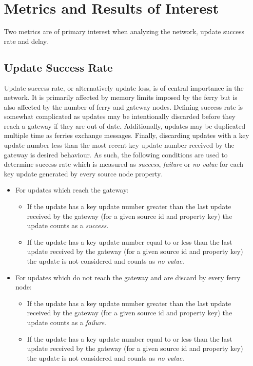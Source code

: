 \section{Metrics and Results of Interest }
\label{sec:metrics}

Two metrics are of primary interest when analyzing the network, update success rate and delay.

\subsection{Update Success Rate}
\label{sec:packetloss}

Update success rate, or alternatively update loss, is of central importance in the network.
It is primarily affected by memory limits imposed by the ferry but is also affected by the number of ferry and gateway nodes.
Defining success rate is somewhat complicated as updates may be intentionally discarded before they reach a gateway if they are out of date.
Additionally, updates may be duplicated multiple time as ferries exchange messages.
Finally, discarding updates with a key update number less than the most recent key update number received by the gateway is desired behaviour.
As such, the following conditions are used to determine success rate which is measured as \emph{success}, \emph{failure} or \emph{no value} for each key update generated by every source node property.

\begin{itemize}
\item For updates which reach the gateway:
	\begin{itemize}
	\item If the update has a key update number greater than the last update received by the gateway (for a given source id and property key) the update counts as a \emph{success}.
	\item If the update has a key update number equal to or less than the last update received by the gateway (for a given source id and property key) the update is not considered and counts as \emph{no value}.
	\end{itemize}
\item For updates which do not reach the gateway and are discard by every ferry node:
	\begin{itemize}
	\item If the update has a key update number greater than the last update received by the gateway (for a given source id and property key) the update counts as a \emph{failure}.
	\item If the update has a key update number equal to or less than the last update received by the gateway (for a given source id and property key) the update is not considered and counts as \emph{no value}.
	\end{itemize}
\end{itemize}

